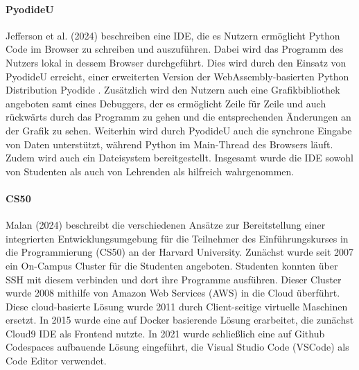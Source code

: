 \paragraph{PyodideU}
Jefferson et al. (2024) \cite{jefferson_pyodideu_2024} beschreiben eine IDE, die es Nutzern ermöglicht Python Code im Browser zu schreiben und auszuführen. Dabei wird das Programm des Nutzers lokal in dessem Browser durchgeführt. Dies wird durch den Einsatz von PyodideU erreicht, einer erweiterten Version der WebAssembly-basierten Python Distribution Pyodide \cite{noauthor_pyodide_nodate}. Zusätzlich wird den Nutzern auch eine Grafikbibliothek angeboten samt eines Debuggers, der es ermöglicht Zeile für Zeile und auch rückwärts durch das Programm zu gehen und die entsprechenden Änderungen an der Grafik zu sehen. Weiterhin wird durch PyodideU auch die synchrone Eingabe von Daten unterstützt, während Python im Main-Thread des Browsers läuft. Zudem wird auch ein Dateisystem bereitgestellt. Insgesamt wurde die IDE sowohl von Studenten als auch von Lehrenden als hilfreich wahrgenommen. 

\paragraph{CS50}
Malan (2024) \cite{malan_containerizing_2024} beschreibt die verschiedenen Ansätze zur Bereitstellung einer integrierten Entwicklungsumgebung für die Teilnehmer des Einführungskurses in die Programmierung (CS50) an der Harvard University. Zunächst wurde seit 2007 ein On-Campus Cluster für die Studenten angeboten. Studenten konnten über SSH mit diesem verbinden und dort ihre Programme ausführen. Dieser Cluster wurde 2008 mithilfe von Amazon Web Services (AWS) \cite{noauthor_amazon_nodate} in die Cloud überführt. Diese cloud-basierte Lösung wurde 2011 durch Client-seitige virtuelle Maschinen ersetzt. In 2015 wurde eine auf Docker basierende Lösung erarbeitet, die zunächst Cloud9 IDE \cite{noauthor_cloud_nodate} als Frontend nutzte. In 2021 wurde schließlich eine auf Github Codespaces aufbauende Lösung eingeführt, die Visual Studio Code (VSCode)  als Code Editor verwendet. 